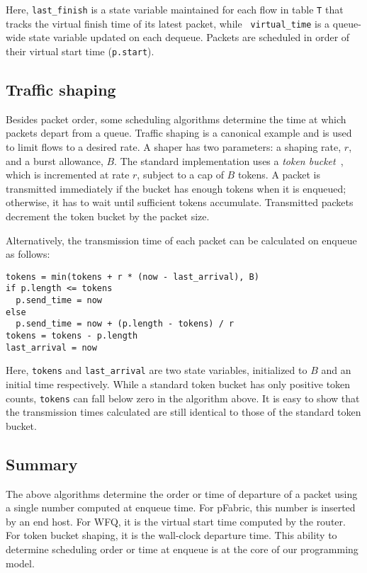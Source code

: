 Here, {\tt last\_finish} is a state variable maintained for each flow in table
{\tt T} that tracks the virtual finish time of its latest packet, while {\tt
virtual\_time} is a queue-wide state variable updated on each dequeue.  Packets
are scheduled in order of their virtual start time ({\tt p.start}).

\subsection{Traffic shaping}
Besides packet order, some scheduling algorithms determine the time at which
packets depart from a queue. Traffic shaping is a canonical example and is used
to limit flows to a desired rate. A shaper has two parameters: a shaping rate,
$r$, and a burst allowance, $B$. The standard implementation uses a {\em token
bucket}~\cite{tbf}, which is incremented at rate $r$, subject to a cap
of $B$ tokens. A packet is transmitted immediately if the bucket has enough
tokens when it is enqueued; otherwise, it has to wait until sufficient tokens
accumulate. Transmitted packets decrement the token bucket by the packet size.

Alternatively, the transmission time of each packet can be calculated
on enqueue as follows: 
\begin{lstlisting}[style=customc]
tokens = min(tokens + r * (now - last_arrival), B)
if p.length <= tokens
  p.send_time = now
else
  p.send_time = now + (p.length - tokens) / r
tokens = tokens - p.length
last_arrival = now
\end{lstlisting}

Here, {\tt tokens} and {\tt last\_arrival} are two state variables, initialized
to $B$ and an initial time respectively.  While a standard token bucket has
only positive token counts, {\tt tokens} can fall below zero in the algorithm
above.  It is easy to show that the transmission times calculated are still
identical to those of the standard token bucket.

\subsection{Summary}
The above algorithms determine the order or time of departure of a packet using
a single number computed at enqueue time. For pFabric, this number is inserted
by an end host. For WFQ, it is the virtual start time computed by the router.
For token bucket shaping, it is the wall-clock departure time. This ability to
determine scheduling order or time at enqueue is at the core of our programming
model.
